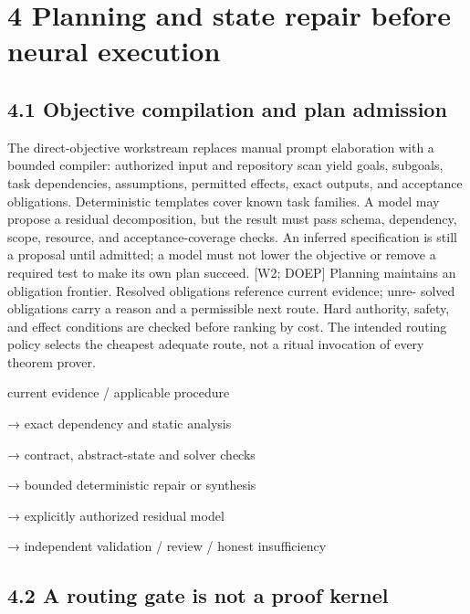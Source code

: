 \documentclass{article}
\begin{document}
\section*{4 Planning and state repair before neural execution}
\subsection*{4.1 Objective compilation and plan admission}

The direct-objective workstream replaces manual prompt elaboration with a bounded compiler:
authorized input and repository scan yield goals, subgoals, task dependencies, assumptions, permitted
effects, exact outputs, and acceptance obligations. Deterministic templates cover known task families.
A model may propose a residual decomposition, but the result must pass schema, dependency, scope,
resource, and acceptance-coverage checks. An inferred specification is still a proposal until admitted;
a model must not lower the objective or remove a required test to make its own plan succeed. [W2;
DOEP]
Planning maintains an obligation frontier. Resolved obligations reference current evidence; unre-
solved obligations carry a reason and a permissible next route. Hard authority, safety, and effect
conditions are checked before ranking by cost. The intended routing policy selects the cheapest
adequate route, not a ritual invocation of every theorem prover.

\noindent current evidence / applicable procedure\par
\noindent → exact dependency and static analysis\par
\noindent → contract, abstract-state and solver checks\par
\noindent → bounded deterministic repair or synthesis\par
\noindent → explicitly authorized residual model\par
\noindent → independent validation / review / honest insufficiency\par

\subsection*{4.2 A routing gate is not a proof kernel}
\end{document}
